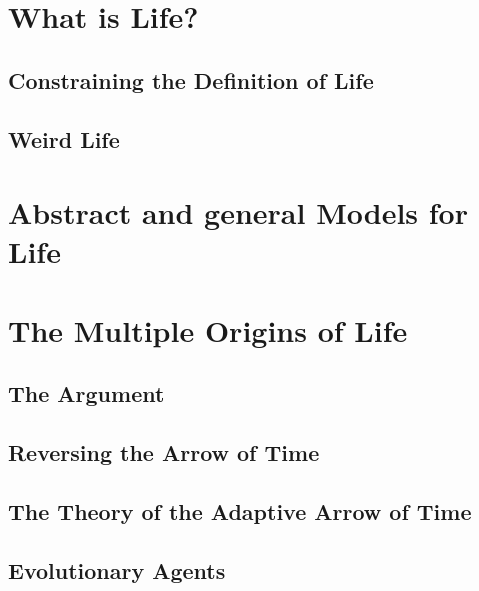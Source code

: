 \documentclass[]{article}
\begin{document}
\section{What is Life?}

\subsection{Constraining the Definition of Life}

\cite{schrodinger1944life}

\subsection{Weird Life}

\cite{hollants2011life}

\cite{kim2001life}

\cite[Chapter 6: Why Water? Toward More Exotic Habitats ]{board2007limits}

\cite{cejkova2014dynamics}

\section{Abstract and general Models for Life}

\cite{trifonov2011vocabulary}

\cite{cronin2016beyond}

\section{The Multiple Origins of Life}

\subsection{The Argument}

\subsection{Reversing the Arrow of Time}

\subsection{The Theory of the Adaptive Arrow of Time}

\cite{rockmore2018cultural}

\subsection{Evolutionary Agents}
\end{document}
